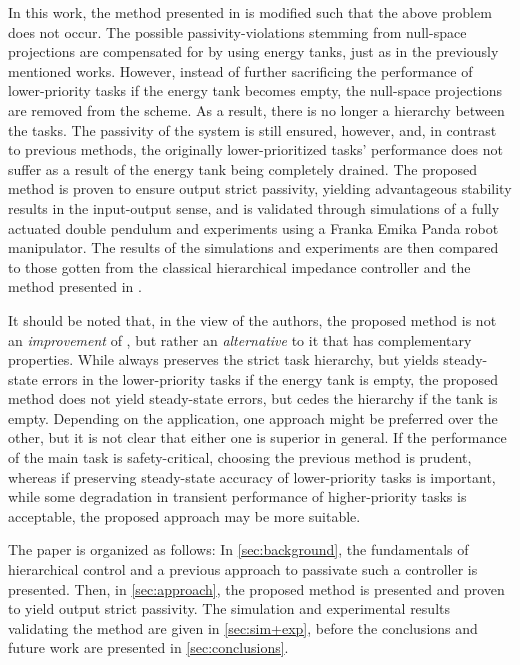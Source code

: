 \documentclass[../main.tex]{subfiles}
\begin{document}
In this work, the method presented in \cite{dietrichPassiveHierarchicalImpedance2017} is modified such that the above problem does not occur. The possible passivity-violations stemming from null-space projections are compensated for by using energy tanks, just as in the previously mentioned works. However, instead of further sacrificing the performance of lower-priority tasks if the energy tank becomes empty, the null-space projections are removed from the scheme. As a result, there is no longer a hierarchy between the tasks. The passivity of the system is still ensured, however, and, in contrast to previous methods, the originally lower-prioritized tasks' performance does not suffer as a result of the energy tank being completely drained. The proposed method is proven to ensure output strict passivity, yielding advantageous stability results in the input-output sense, and is validated through simulations of a fully actuated double pendulum and experiments using a Franka Emika Panda robot manipulator. The results of the simulations and experiments are then compared to those gotten from the classical hierarchical impedance controller and the method presented in \cite{dietrichPassiveHierarchicalImpedance2017}.

It should be noted that, in the view of the authors, the proposed method is not an \textit{improvement} of \cite{dietrichPassiveHierarchicalImpedance2017}, but rather an \textit{alternative} to it that has complementary properties. While \cite{dietrichPassiveHierarchicalImpedance2017} always preserves the strict task hierarchy, but yields steady-state errors in the lower-priority tasks if the energy tank is empty, the proposed method does not yield steady-state errors, but cedes the hierarchy if the tank is empty. Depending on the application, one approach might be preferred over the other, but it is not clear that either one is superior in general. If the performance of the main task is safety-critical, choosing the previous method is prudent, whereas if preserving steady-state accuracy of lower-priority tasks is important, while some degradation in transient performance of higher-priority tasks is acceptable, the proposed approach may be more suitable.

The paper is organized as follows: In \cref{sec:background}, the fundamentals of hierarchical control and a previous approach to passivate such a controller is presented. Then, in \cref{sec:approach}, the proposed method is presented and proven to yield output strict passivity. The simulation and experimental results validating the method are given in \cref{sec:sim+exp}, before the conclusions and future work are presented in \cref{sec:conclusions}.
\end{document}
